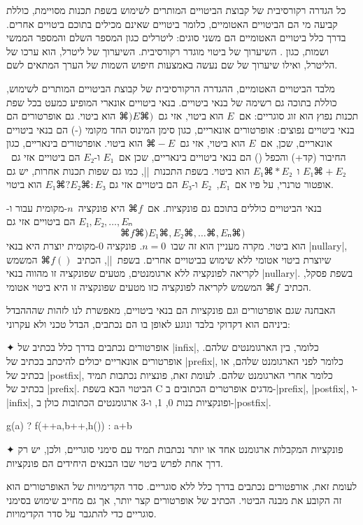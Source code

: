 כל הגדרה רקורסיבית של קבוצת הביטויים המותרים לשימוש בשפת תכנות מסויימת, כוללת
קביעה מי הם הביטויים האטומיים, כלומר ביטויים שאינם מכילים בתוכם ביטויים אחרים.
בדרך כלל ביטויים האטומיים הם משני סוגים: ליטרלים כגון המספר השלם  והמספר
הממשי  ושמות, כגון . השיערוך של ביטוי מוגדר רקורסיבית. השיערוך
של ליטרל, הוא ערכו של הליטרל, ואילו שיערוך של שם נעשה באמצעות חיפוש השמות של
הערך המתאים לשם.

מלבד הביטויים האטומיים, ההגדרה הרקורסיבית של קבוצת הביטויים המותרים לשימוש,
כוללת בתוכה גם רשימה של בנאי ביטויים. בנאי ביטויים אונארי המופיע כמעט בכל שפת
תכנות נפוץ הוא זוג סוגריים: אם~$E$ הוא ביטוי, אזי גם~$⌘)E⌘)$ הוא ביטוי.
גם אופרטורים הם בנאי ביטויים נפוצים: אופרטורים אונאריים, כגון סימן המינוס החד
מקומי (-) הם בנאי ביטויים אונאריים, שכן, אם~$E$ הוא ביטוי,
אזי גם~$⌘-E$ הוא ביטוי. אופרטורים בינאריים, כגון החיבור (קד+) והכפל () הם
בנאי ביטויים בינאריים, שכן אם~$E₁$ ו-$E₂$ הם ביטויים אזי גם~$E₁⌘+E₂$
ו~$E₁⌘*E₂$ הוא ביטוי. בשפת התכנות~\E|\CPL|, כמו גם שפות תכנות אחרות, יש גם
אופטור טרנרי, על פיו אם~$E₁$,~$E₂$ ו-$E₃$ הם ביטויים אזי גם
$E₁⌘?E₂⌘:E₃$ הוא ביטוי.

בנאי הביטויים כוללים בתוכם גם פונקציות. אם~$⌘f$ היא פונקציה~$n$-מקומית עבור
ו-$E₁,E₂,…,Eₙ$ הם ביטויים אזי גם \[
  ⌘f⌘)E₁⌘,E₂⌘,…⌘,Eₙ⌘)
\] הוא ביטוי. מקרה מעניין הוא זה שבו~$n=0$. פונקציה 0-מקומית יוצרת היא בנאי
\E|nullary|, שיוצרת ביטוי אטומי ללא שימוש בביטויים אחרים. בשפת~\E|\CPL|,
הכתיב~$⌘{f()}$ המשמש לקריאה לפונקציה ללא ארגומנטים, מטעים שפונקציה זו מהווה
בנאי \E|nullary|. בשפת פסקל, הכתיב~$⌘f$ המשמש לקריאה לפונקציה כזו מטעים
שפונקציה זו היא ביטוי אטומי.

האבחנה שגם אופרטורים וגם פונקציות הם בנאי ביטויים, מאפשרת לנו לזהות שהההבדל
ביניהם הוא דקדוקי בלבד ונוגע לאופן בו הם נכתבים, הבדל טכני ולא עקרוני:

✦ אופרטורים נכתבים בדרך כלל בכתיב של \E|infix|, כלומר, בין הארגומנטים שלהם.
אופרטורים אונאריים יכולים להיכתב בכתיב של \E|prefix|, כלומר לפני הארגומנט שלהם,
או בכתיב של \E|postfix|, כלומר אחרי הארגומנט שלהם. לעומת זאת, פונציות נכתבות
תמיד בכתיב של \E|prefix|.
הביטוי הבא בשפת C מדגים אופרטרים הכתובים ב-\E|prefix|, \E|postfix|, ו-\E|infix|,
ופונקציות בנות 0, 1, ו-3 ארגומנטים הכתובות כולן ב-\E|postfix|.
\begin{CPP}
  g(a) ? f(++a,b++,h()) : a+b
\end{CPP}
✦ פונקציות המקבלות ארגומנט אחד או יותר נכתבות תמיד עם סימני סוגריים, ולכן, יש
רק דרך אחת לפרש ביטוי שבו הבנאים היחידים הם פונקציות.

לעומת זאת, אורפטורים נכתבים בדרך כלל ללא סוגריים. סדר הקדימויות של האופרטורים
הוא זה הקובע את מבנה הביטוי. הכתיב של אופרטורים קצר יותר, אך גם מחייב
שימוש בסימני סוגריים כדי להתגבר על סדר הקדימויות.

